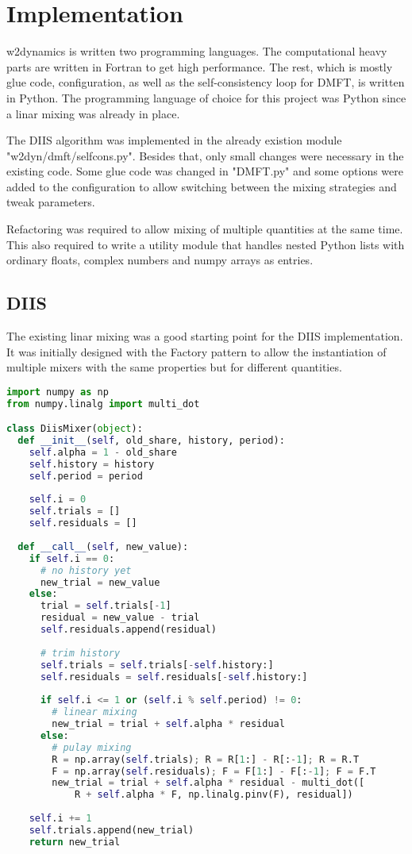\chapter{Implementation}
\label{ch:impl}
w2dynamics\cite{w2dyn}\cite{w2dyn_ref} is written two programming languages. The computational heavy parts are written in Fortran to get high performance. The rest, which is mostly glue code, configuration, as well as the self-consistency loop for DMFT, is written in Python. The programming language of choice for this project was Python since a linar mixing was already in place.

The DIIS algorithm was implemented in the already existion module "w2dyn/dmft/selfcons.py". Besides that, only small changes were necessary in the existing code. Some glue code was changed in "DMFT.py" and some options were added to the configuration to allow switching between the mixing strategies and tweak parameters.

Refactoring was required to allow mixing of multiple quantities at the same time. This also required to write a utility module that handles nested Python lists with ordinary floats, complex numbers and numpy arrays as entries.

\section{DIIS}
The existing linar mixing was a good starting point for the DIIS implementation. It was initially designed with the Factory pattern to allow the instantiation of multiple mixers with the same properties but for different quantities.

\begin{lstlisting}[label=lst:diis, language=python, caption=DIIS implementation]
import numpy as np
from numpy.linalg import multi_dot

class DiisMixer(object):
  def __init__(self, old_share, history, period):
    self.alpha = 1 - old_share
    self.history = history
    self.period = period
    
    self.i = 0
    self.trials = []
    self.residuals = []
  
  def __call__(self, new_value):
    if self.i == 0:
      # no history yet
      new_trial = new_value
    else:
      trial = self.trials[-1]
      residual = new_value - trial
      self.residuals.append(residual)
      
      # trim history
      self.trials = self.trials[-self.history:]
      self.residuals = self.residuals[-self.history:]
      
      if self.i <= 1 or (self.i % self.period) != 0:
        # linear mixing
        new_trial = trial + self.alpha * residual
      else:
        # pulay mixing
        R = np.array(self.trials); R = R[1:] - R[:-1]; R = R.T
        F = np.array(self.residuals); F = F[1:] - F[:-1]; F = F.T
        new_trial = trial + self.alpha * residual - multi_dot([
            R + self.alpha * F, np.linalg.pinv(F), residual])
    
    self.i += 1
    self.trials.append(new_trial)
    return new_trial
\end{lstlisting}

